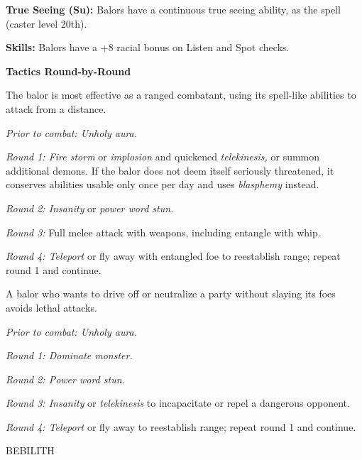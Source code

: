 \documentclass{article}
\begin{document}
\textbf{True Seeing (Su):} Balors have a continuous true seeing ability, as the 
spell (caster level 20th).

\textbf{Skills:} Balors have a +8 racial bonus on Listen and Spot checks.

\textbf{Tactics Round-by-Round}

The balor is most effective as a ranged combatant, using its spell-like abilities 
to attack from a distance.

\textit{Prior to combat: Unholy aura.}

\textit{Round 1: Fire storm }or \textit{implosion }and quickened \textit{telekinesis, 
}or summon additional demons. If the balor does not deem itself seriously threatened, 
it conserves abilities usable only once per day and uses \textit{blasphemy }instead.

\textit{Round 2: Insanity }or \textit{power word stun.}

\textit{Round 3: }Full melee attack with weapons, including entangle with whip.

\textit{Round 4: Teleport }or fly away with entangled foe to reestablish range; 
repeat round 1 and continue.

A balor who wants to drive off or neutralize a party without slaying its foes avoids 
lethal attacks.

\textit{Prior to combat: Unholy aura.}

\textit{Round 1: Dominate monster.}

\textit{Round 2: Power word stun.}

\textit{Round 3: Insanity }or \textit{telekinesis }to incapacitate or repel a dangerous 
opponent.

\textit{Round 4: Teleport }or fly away to reestablish range; repeat round 1 and 
continue.

\vspace{12pt}
BEBILITH
\end{document}
